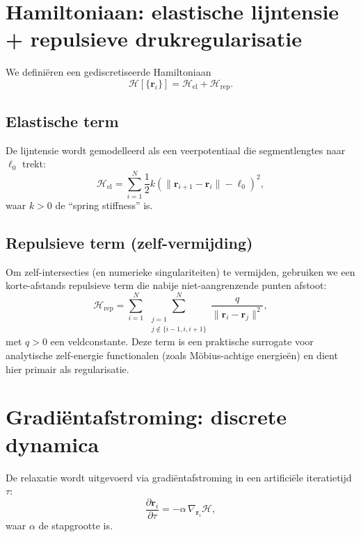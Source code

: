\documentclass[11pt]{article}
\begin{document}
        \section{Hamiltoniaan: elastische lijntensie + repulsieve drukregularisatie}
        We defini\"eren een gediscretiseerde Hamiltoniaan
        \begin{equation}
            \mathcal{H}[\{\mathbf{r}_i\}] = \mathcal{H}_{\mathrm{el}} + \mathcal{H}_{\mathrm{rep}}.
            \label{eq:Htotal}
        \end{equation}

        \subsection{Elastische term}
            De lijntensie wordt gemodelleerd als een veerpotentiaal die segmentlengtes naar $\ell_0$ trekt:
            \begin{equation}
                \mathcal{H}_{\mathrm{el}}
                =\sum_{i=1}^{N}\frac{1}{2}k\left(\|\mathbf{r}_{i+1}-\mathbf{r}_i\|-\ell_0\right)^2,
                \label{eq:Hel}
            \end{equation}
            waar $k>0$ de ``spring stiffness'' is.

        \subsection{Repulsieve term (zelf-vermijding)}
            Om zelf-intersecties (en numerieke singulariteiten) te vermijden, gebruiken we een korte-afstands repulsieve term die nabije niet-aangrenzende punten afstoot:
            \begin{equation}
                \mathcal{H}_{\mathrm{rep}}
                =\sum_{i=1}^{N}\ \sum_{\substack{j=1\\ j\notin\{i-1,i,i+1\}}}^{N}
                \frac{q}{\|\mathbf{r}_i-\mathbf{r}_j\|^{2}},
                \label{eq:Hrep}
            \end{equation}
            met $q>0$ een veldconstante. Deze term is een praktische surrogate voor analytische zelf-energie functionalen (zoals M\"obius-achtige energie\"en) en dient hier primair als regularisatie.

        \section{Gradi\"entafstroming: discrete dynamica}
        De relaxatie wordt uitgevoerd via gradi\"entafstroming in een artifici\"ele iteratietijd $\tau$:
        \begin{equation}
            \frac{\partial \mathbf{r}_i}{\partial \tau} = -\alpha\, \nabla_{\mathbf{r}_i}\mathcal{H},
            \label{eq:gd}
        \end{equation}
        waar $\alpha$ de stapgrootte is.
\end{document}

